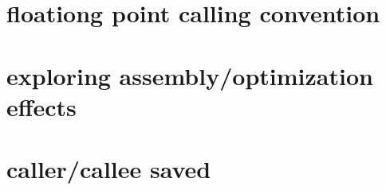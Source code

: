 \section{floationg point calling convention}

\section{exploring assembly/optimization effects}

\section{caller/callee saved}

